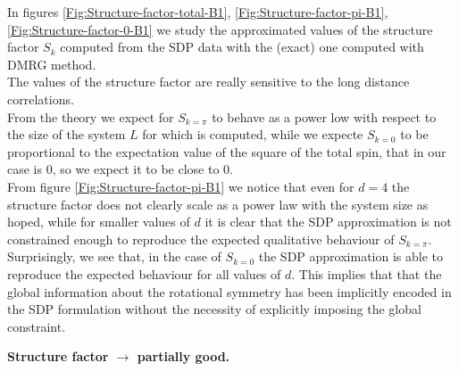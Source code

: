 \documentclass[10pt,a4paper,twoside,twocolumn]{revtex4-1}
\begin{document}
In figures \ref{Fig:Structure-factor-total-B1}, \ref{Fig:Structure-factor-pi-B1}, \ref{Fig:Structure-factor-0-B1} we study the approximated values of the structure factor  $S_k$ computed from the SDP data with the (exact) one computed with DMRG method.\\
The values of the structure factor are really sensitive to the long distance correlations. \\
From the theory we expect for $S_{k=\pi}$ to behave as a power low with respect to the size of the system $L$ for which is computed, while we expecte $S_{k=0}$ to be proportional to the expectation value of the square of the total spin, that in our case is $0$, so we expect it to be close to $0$. \\
From figure \ref{Fig:Structure-factor-pi-B1} we notice that even for $d=4$ the structure factor does not clearly scale as a power law with the system size as hoped, while for smaller values of $d$ it is clear that the SDP approximation is not constrained enough to reproduce the expected qualitative behaviour of $S_{k=\pi}$.
Surprisingly, we see that, in the case of $S_{k=0}$ the SDP approximation is able to reproduce the expected behaviour for all values of $d$. This implies that that the global information about the rotational symmetry has been implicitly encoded in the SDP formulation without the necessity of explicitly imposing the global constraint.

\textbf{Structure factor $\rightarrow$ partially good.}
\end{document}
